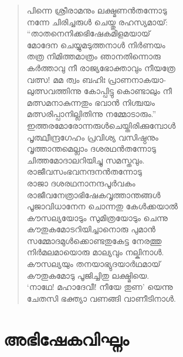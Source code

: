 \begin{verse}
പിന്നെ ശ്രീരാമനും ലക്ഷ്മണന്‍തന്നോടു\\
നന്നേ ചിരിച്ചരുള്‍ ചെയ്തു രഹസ്യമായ്:\\
“താതനെനിക്കഭിഷേകമിളമയായ്\\
മോദേന ചെയ്യുമടുത്തനാള്‍ നിര്‍ണയം\\
തത്ര നിമിത്തമാത്രം ഞാനതിന്നൊരു\\
കര്‍ത്താവു നീ രാജ്യഭോക്താവും നീയത്രേ\\
വത്സ! മമ ത്വം ബഹിഃ പ്രാണനാകയാ-\\
ലുത്സവത്തിന്നു കോപ്പിട്ടു കൊണ്ടാലും നീ\\
മത്സമനാകുന്നതും ഭവാന്‍ നിശ്ചയം\\
മത്സരിപ്പാനില്ലിതിന്നു നമ്മോടാരും.”\\
ഇത്തരമോരോന്നരുള്‍ചെയ്തിരിക്കുമ്പോള്‍\\
പൃത്ഥ്വീന്ദ്രഗേഹം പ്രവിശ്യ വസിഷ്ഠനും\\
വൃത്താന്തമെല്ലാം ദശരഥന്‍തന്നോടു\\
ചിത്തമോദാലറിയിച്ചു സമസ്തവും.\\
രാജീവസംഭവനന്ദനന്‍തന്നോടു\\
രാജാ ദശരഥനാനന്ദപൂര്‍വകം\\
രാജീവനേത്രാഭിഷേകവൃത്താന്തങ്ങള്‍\\
പൂജാവിധാനേന ചൊന്നതു കേള്‍ക്കയാല്‍\\
കൗസല്യയോടും സുമിത്രയോടും ചെന്നു\\
കൗതുകമോടറിയിച്ചാനൊരു പുമാന്‍\\
സമ്മോദമുള്‍ക്കൊണ്ടതുകേട്ട നേരത്തു\\
നിര്‍മലമായൊരു മാല്യവും നല്കിനാള്‍.\\
കൗസല്യയും തനയാഭ്യുദയാര്‍ഥമായ്\\
കൗതുകമോടു പൂജിച്ചിതു ലക്ഷ്മിയെ.\\
‘നാഥേ! മഹാദേവീ! നീയേ തുണ’ യെന്നു\\
ചേതസി ഭക്ത്യാ വണങ്ങി വാണീടിനാള്‍.
\end{verse}

\section{അഭിഷേകവിഘ്നം}

